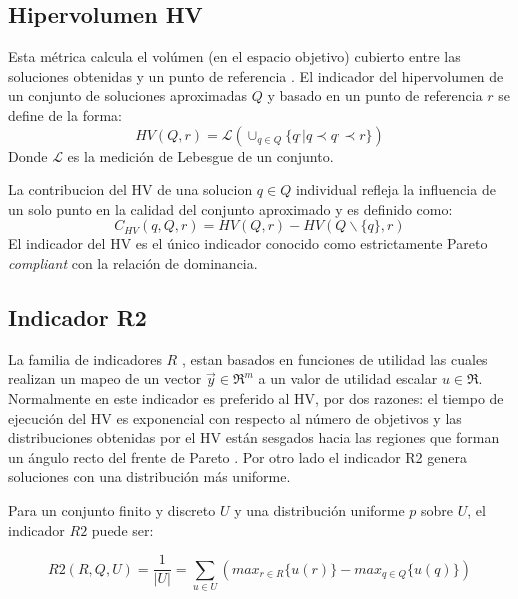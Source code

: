 \subsection{Hipervolumen HV}
Esta métrica calcula el volúmen (en el espacio objetivo) cubierto entre las soluciones obtenidas y un punto de referencia \citep{Joel:Lebesgue_Measure}. 
%	
El indicador del hipervolumen de un conjunto de soluciones aproximadas $Q$ y basado en un punto de referencia $r$ se define de la forma:
\begin{equation}
HV(Q, r) = \mathcal{L}(  \cup_{q \in Q} \{ q^,  | q \prec q^, \prec r  \}  )
\end{equation}
Donde  $\mathcal{L}$ es la medición de Lebesgue de un conjunto.

La contribucion del HV de una solucion $q \in Q$ individual refleja la influencia de un solo punto en la calidad del conjunto aproximado y es definido como:
\begin{equation}
C_{HV}(q,Q,r) = HV(Q,r) - HV(Q \backslash \{ q\}, r)
\end{equation}
El indicador del HV es el único indicador conocido como estrictamente Pareto \textit{compliant} con la relación de dominancia. 
\subsection{Indicador R2}
La familia de indicadores $R$ \citep{Joel:R2_Many_Objective}, estan basados en funciones de utilidad las cuales realizan un mapeo de un vector $\vec{y} \in \Re^m$ a un valor de utilidad escalar $u \in \Re$.
%
Normalmente en este indicador es preferido al HV, por dos razones: el tiempo de ejecución del HV es exponencial con respecto al número de objetivos \citep{Joel:ReferencePointBasedNonDominateSortingApproach} y las distribuciones obtenidas por el HV están sesgados hacia las regiones que forman un ángulo recto del frente de Pareto \citep{Joel:OnPropertiesR2Indicator}.
%
Por otro lado el indicador R2 genera soluciones con una distribución más uniforme.

\begin{Classic}
Para un conjunto finito y discreto $U$ y una distribución uniforme $p$ sobre $U$, el indicador $R2$ puede ser:
\end{Classic}
\begin{equation}
R2(R, Q, U) = \frac{1}{|U|} = \sum_{u \in U} \left ( max_{r \in R} \{ u(r) \} - max_{q \in Q}\{u(q)\} \right )
\end{equation}

